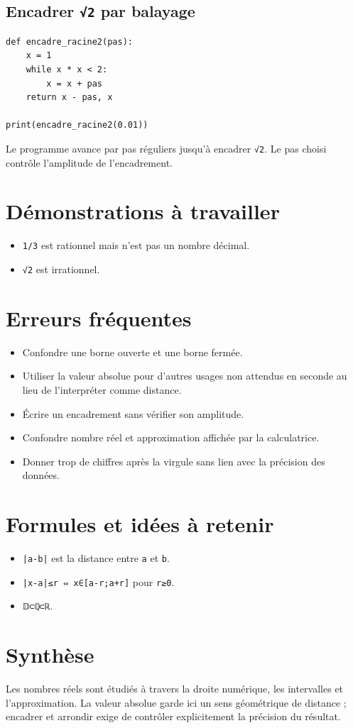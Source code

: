 \subsection{Encadrer \texttt{√2} par balayage}

\begin{verbatim}
def encadre_racine2(pas):
    x = 1
    while x * x < 2:
        x = x + pas
    return x - pas, x

print(encadre_racine2(0.01))
\end{verbatim}

Le programme avance par pas réguliers jusqu'à encadrer \texttt{√2}. Le pas choisi contrôle l'amplitude de l'encadrement.

\section{Démonstrations à travailler}

\begin{itemize}
\item \texttt{1/3} est rationnel mais n'est pas un nombre décimal.
\item \texttt{√2} est irrationnel.
\end{itemize}

\section{Erreurs fréquentes}

\begin{itemize}
\item Confondre une borne ouverte et une borne fermée.
\item Utiliser la valeur absolue pour d'autres usages non attendus en seconde au lieu de l'interpréter comme distance.
\item Écrire un encadrement sans vérifier son amplitude.
\item Confondre nombre réel et approximation affichée par la calculatrice.
\item Donner trop de chiffres après la virgule sans lien avec la précision des données.
\end{itemize}

\section{Formules et idées à retenir}

\begin{itemize}
\item \texttt{|a-b|} est la distance entre \texttt{a} et \texttt{b}.
\item \texttt{|x-a|≤r ⇔ x∈[a-r;a+r]} pour \texttt{r≥0}.
\item \texttt{𝔻⊂ℚ⊂ℝ}.
\end{itemize}

\section{Synthèse}

Les nombres réels sont étudiés à travers la droite numérique, les intervalles et l'approximation. La valeur absolue garde ici un sens géométrique de distance ; encadrer et arrondir exige de contrôler explicitement la précision du résultat.

